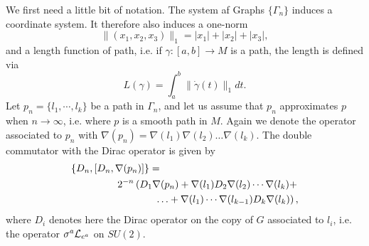 \documentclass[12pt]{article}
\newcommand{\nn}{\nonumber}
\def\cl{{\cal L}}
\begin{document}
 
We first need a little bit of notation. The system af Graphs $\{ \Gamma_n \}$ induces a coordinate system. It therefore also induces  a one-norm
$$\| (x_1,x_2,x_3 )\|_1=|x_1|+|x_2|+|x_3|  ,$$
and a length function of path, i.e. if $\gamma: [a,b]\to M$ is a path, the length is defined via
$$ L(\gamma )=\int_a^b \|\dot{\gamma} (t)\|_1 dt  .$$ 
% 
% 
Let $p_n=\{ l_1, \cdots , l_k \}$ be a path in $\Gamma_n$, and let us assume that $p_n$ approximates $p$ when $n\to \infty$, i.e. where $p$ is a smooth path in $M$. Again we denote the operator associated to $p_n$ with $\nabla({p_n})=\nabla(l_1)\nabla(l_2)\ldots\nabla(l_k)$. The double commutator with the Dirac operator is given by
\begin{eqnarray} 
\label{formeldi}
 \{ D_n,[D_n, \nabla(p_n)] \} &=& 
 \nn\\&&\hspace{-2cm}
 2^{-n}\left( D_1\nabla({p_n}) +\nabla({l_1})D_2 \nabla({l_{2}}) \cdots \nabla({l_k})+\right.
 \nn\\&&\left.
\hspace{-0.5cm} \ldots+ \nabla({l_1}) \cdots \nabla({l_{k-1}}) D_k \nabla({l_k})    \right),
\end{eqnarray}
where $D_i$ denotes here the Dirac operator on the copy of $G$ associated to $l_i$, i.e. the operator $ \sigma^a\cl_{e^a} $ on $SU(2)$. 
\end{document}
